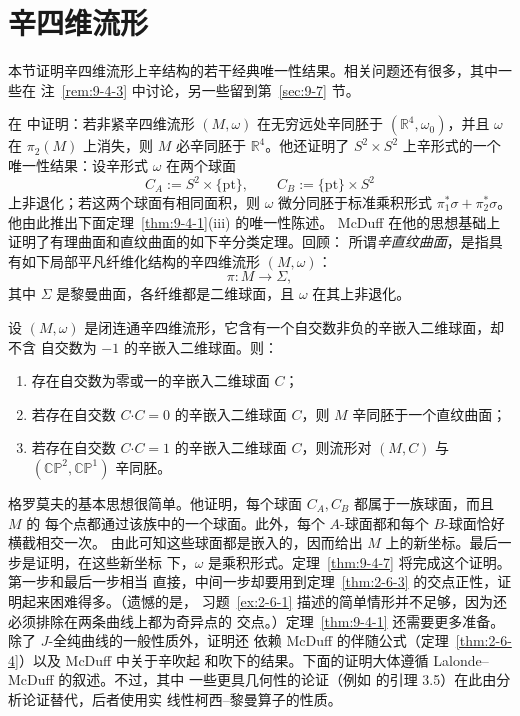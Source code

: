 
\section{辛四维流形}\label{sec:9-4}

本节证明辛四维流形上辛结构的若干经典唯一性结果。相关问题还有很多，其中一些在
注~\ref{rem:9-4-3} 中讨论，另一些留到第~\ref{sec:9-7} 节。

在  中证明：若非紧辛四维流形
$(M,\omega)$ 在无穷远处辛同胚于 $(\mathbb R^4,\omega_0)$，并且 $\omega$ 在
$\pi_2(M)$ 上消失，则 $M$ 必辛同胚于 $\mathbb R^4$。他还证明了
$S^2\times S^2$ 上辛形式的一个唯一性结果：设辛形式 $\omega$ 在两个球面
\[
  C_A:=S^2\times\{\mathrm{pt}\},
  \qquad
  C_B:=\{\mathrm{pt}\}\times S^2
\]
上非退化；若这两个球面有相同面积，则 $\omega$ 微分同胚于标准乘积形式
$\pi_1^*\sigma+\pi_2^*\sigma$。他由此推出下面定理~\ref{thm:9-4-1}(iii) 的唯一性陈述。
McDuff  在他的思想基础上证明了有理曲面和直纹曲面的如下辛分类定理。回顾：
所谓\emph{辛直纹曲面}，是指具有如下局部平凡纤维化结构的辛四维流形 $(M,\omega)$：
\[
  \pi:M\longrightarrow\Sigma,
\]
其中 $\Sigma$ 是黎曼曲面，各纤维都是二维球面，且 $\omega$ 在其上非退化。

\begin{theorem}[McDuff]\label{thm:9-4-1}
设 $(M,\omega)$ 是闭连通辛四维流形，它含有一个自交数非负的辛嵌入二维球面，却不含
自交数为 $-1$ 的辛嵌入二维球面。则：
\begin{enumerate}[label=(\roman*),leftmargin=3em]
\item 存在自交数为零或一的辛嵌入二维球面 $C$；
\item 若存在自交数 $C\mathbin{\boldsymbol\cdot}C=0$ 的辛嵌入二维球面 $C$，则
$M$ 辛同胚于一个直纹曲面；
\item 若存在自交数 $C\mathbin{\boldsymbol\cdot}C=1$ 的辛嵌入二维球面 $C$，则流形对
$(M,C)$ 与 $(\mathbb{CP}^2,\mathbb{CP}^1)$ 辛同胚。
\end{enumerate}
\end{theorem}

格罗莫夫的基本思想很简单。他证明，每个球面 $C_A,C_B$ 都属于一族球面，而且 $M$ 的
每个点都通过该族中的一个球面。此外，每个 $A$-球面都和每个 $B$-球面恰好横截相交一次。
由此可知这些球面都是嵌入的，因而给出 $M$ 上的新坐标。最后一步是证明，在这些新坐标
下，$\omega$ 是乘积形式。定理~\ref{thm:9-4-7} 将完成这个证明。第一步和最后一步相当
直接，中间一步却要用到定理~\ref{thm:2-6-3} 的交点正性，证明起来困难得多。（遗憾的是，
习题~\ref{ex:2-6-1} 描述的简单情形并不足够，因为还必须排除在两条曲线上都为奇异点的
交点。）定理~\ref{thm:9-4-1} 还需要更多准备。除了 $J$-全纯曲线的一般性质外，证明还
依赖 McDuff 的伴随公式（定理~\ref{thm:2-6-4}）以及 McDuff  中关于辛吹起
和吹下的结果。下面的证明大体遵循 Lalonde--McDuff  的叙述。不过，其中
一些更具几何性的论证（例如  的引理 3.5）在此由分析论证替代，后者使用实
线性柯西--黎曼算子的性质。

